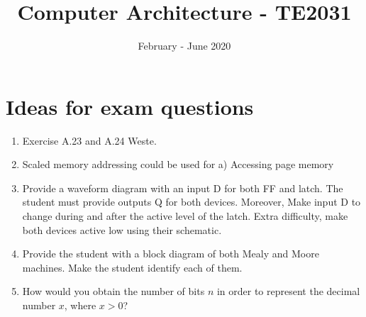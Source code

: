 \documentclass[]{exam}
\title{Computer Architecture - TE2031}
\date{February - June 2020}
\newif\ifanswers
\begin{document}
\section*{Ideas for exam questions}

\begin{enumerate}
\item Exercise A.23 and A.24 Weste.
\item Scaled memory addressing could be used for
a) Accessing page memory
\item Provide a waveform diagram with an input D for both \ac{FF} and latch. The student must provide outputs Q for both devices. Moreover, Make input D to change during and after the active level of the latch. Extra difficulty, make both devices active low using their schematic.

\ifanswers\\
\alertred{5/15}\\
Both latches and \acp{FF} are sensitive to a clock signal. However, \acp{FF} are edge-sensitive devices,\ie rising and falling edges, whereas latches are level-sensitive devices. 
\begin{figure}[!h]
\centering
\texttt{[image: dff\_latch]}
\label{Figure:FF_latch}
\caption{Difference between \acp{FF} and latches.}
\end{figure}
\fi


\item Provide the student with a block diagram of both Mealy and Moore machines. Make the student identify each of them.
\ifanswers\\
\alertred{0/16}\\
The output of a Moore machine depends \textbf{\textcolor{blue}{only}} on the current state of the machine, whereas a Mealey output depends on both the current state and the inputs of the machine.  
\fi

\item How would you obtain the number of bits $n$ in order to represent the decimal number $x$, where $x>0$?

\ifanswers\\
\alertred{18/24}
$\ceil{log_{2}(938)} = 10$
\fi


\end{enumerate}
\end{document}
